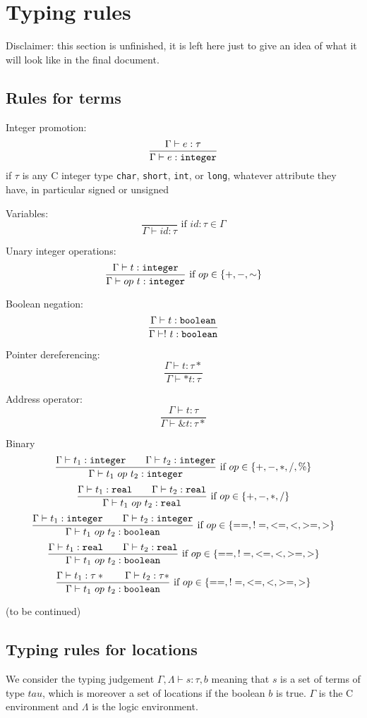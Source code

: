 \section{Typing rules}
\label{sec:typingrules}

Disclaimer: this section is unfinished, it is left here just to give an idea of what it will look like in the final document.

\subsection{Rules for terms}

Integer promotion:
\[
\frac{\Gamma \vdash e : \tau}{\Gamma \vdash e : \texttt{integer}}
\]
if $\tau$ is any C integer type \verb|char|, \verb|short|, \verb|int|, or \verb|long|, whatever attribute they have, in particular signed or unsigned

Variables:
\[
\frac{}{\Gamma \vdash id : \tau} \mbox{ if $id:\tau\in\Gamma$}
\]

Unary integer operations:
\[
\frac{\Gamma \vdash t : \texttt{integer}}{\Gamma \vdash op~t : \texttt{integer}} \mbox{ if $op\in \{+,-,\sim\}$}
\]

Boolean negation:
\[
\frac{\Gamma \vdash t : \texttt{boolean}}{\Gamma \vdash !~t : \texttt{boolean}}
\]

Pointer dereferencing:
\[
\frac{\Gamma \vdash t : \tau*}{\Gamma \vdash *t : \tau}
\]

Address operator:
\[
\frac{\Gamma \vdash t : \tau}{\Gamma \vdash \&t : \tau*}
\]

Binary
\[
\frac{\Gamma \vdash t_1 : \texttt{integer}\qquad\Gamma \vdash t_2 : \texttt{integer}}{\Gamma \vdash t_1~op~t_2 : \texttt{integer}} \mbox{ if $op\in \{+,-,*,/,\%\}$}
\]
\[
\frac{\Gamma \vdash t_1 : \texttt{real}\qquad\Gamma \vdash t_2 : \texttt{real}}{\Gamma \vdash t_1~op~t_2 : \texttt{real}} \mbox{ if $op\in \{+,-,*,/\}$}
\]
\[
\frac{\Gamma \vdash t_1 : \texttt{integer}\qquad\Gamma \vdash t_2 : \texttt{integer}}{\Gamma \vdash t_1~op~t_2 : \texttt{boolean}} \mbox{ if $op\in \{==,!=,<=,<,>=,>\}$}
\]
\[
\frac{\Gamma \vdash t_1 : \texttt{real}\qquad\Gamma \vdash t_2 : \texttt{real}}{\Gamma \vdash t_1~op~t_2 : \texttt{boolean}} \mbox{ if $op\in \{==,!=,<=,<,>=,>\}$}
\]
\[
\frac{\Gamma \vdash t_1 : \tau*\qquad\Gamma \vdash t_2 : \tau*}{\Gamma \vdash t_1~op~t_2 : \texttt{boolean}} \mbox{ if $op\in \{==,!=,<=,<,>=,>\}$}
\]

(to be continued)


\subsection{Typing rules for locations}
We consider the typing judgement $\Gamma,\Lambda \vdash s : \tau,b$
meaning that $s$ is a set of terms of type $tau$, which is moreover a
set of locations if the boolean $b$ is true.
$\Gamma$ is the C environment and $\Lambda$ is the logic environment.

